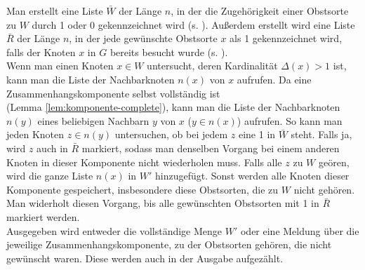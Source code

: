 Man erstellt eine Liste $\bar{W}$ der Länge $n$,
in der die Zugehörigkeit einer Obstsorte zu $W$ durch 1 oder 0 gekennzeichnet wird
(s. ). Außerdem erstellt wird eine Liste $\bar{R}$ der Länge $n$,
in der jede gewünschte Obstsorte $x$ als 1 gekennzeichnet wird, falls der Knoten $x$ in $G$ bereits
besucht wurde (s. ).\\

Wenn man einen Knoten $x \in W$ untersucht, deren Kardinalität $\Delta(x) > 1$ ist,
kann man die Liste der Nachbarknoten $n(x)$ von $x$ aufrufen.
Da eine Zusammenhangskomponente selbst vollständig ist\\ (Lemma \ref{lem:komponente-complete}),
kann man die Liste der Nachbarknoten $n(y)$ eines beliebigen Nachbarn $y$ von $x$ ($y \in n(x)$) aufrufen.
So kann man jeden Knoten $z \in n(y)$ untersuchen, ob bei jedem $z$ eine 1 in $\bar{W}$ steht.
Falls ja, wird $z$ auch in $\bar{R}$ markiert,
sodass man denselben Vorgang bei einem anderen Knoten in dieser Komponente nicht wiederholen muss.
Falls alle $z$ zu $W$ geören, wird
die ganze Liste $n(x)$ in $W'$ hinzugefügt. Sonst werden alle Knoten dieser Komponente 
gespeichert, insbesondere diese Obstsorten, die zu $W$ nicht gehören.\\
Man widerholt diesen Vorgang, bis alle gewünschten Obstsorten mit 1 in $\bar{R}$ markiert werden.\\

Ausgegeben wird entweder die vollständige Menge $W'$ oder eine Meldung über die jeweilige 
Zusammenhangskomponente, zu der Obstsorten gehören, die nicht gewünscht waren.
Diese werden auch in der Ausgabe aufgezählt.
